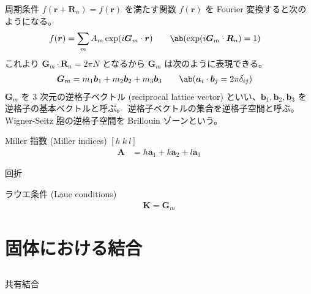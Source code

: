 \documentclass[uplatex,dvipdfmx,a4paper,11pt]{jlreq}
\newcommand{\rr}{\bm{r}}
\renewcommand{\aa}{\bm{a}}
\newcommand{\bb}{\bm{b}}
\numberwithin{equation}{section}
\theoremstyle{definition}
\begin{document}
周期条件 $f(\rr + \bm{R}_n) = f(\rr)$ を満たす関数 $f(\rr)$ を Fourier 変換すると次のようになる。
\begin{align}
  f(\rr) & = \sum_{m}A_m\exp(i\bm{G}_m\cdot\rr) \qquad \ab(\exp(i\bm{G}_m\cdot\bm{R}_n) = 1)
\end{align}
これより $\bm{G}_m\cdot\bm{R}_n = 2\pi N$ となるから $\bm{G}_m$ は次のように表現できる。
\begin{align}
  \bm{G}_m & = m_1\bb_1 + m_2\bb_2 + m_3\bb_3 \qquad \ab(\aa_i\cdot\bb_j = 2\pi\delta_{ij})
\end{align}
$\bm{G}_m$ を 3 次元の逆格子ベクトル (reciprocal lattice vector) といい、$\bb_1, \bb_2, \bb_3$ を逆格子の基本ベクトルと呼ぶ。
逆格子ベクトルの集合を逆格子空間と呼ぶ。
Wigner-Seitz 胞の逆格子空間を Brillouin ゾーンという。

Miller 指数 (Miller indices)
$[h\ k\ l]$
\begin{align}
  \bm{A} & = h\aa_1 + k\aa_2 + l\aa_3
\end{align}

回折

ラウエ条件 (Laue conditions)
\begin{align}
  \bm{K} = \bm{G}_m
\end{align}

\section{固体における結合}

\subsection{}
共有結合
\end{document}
